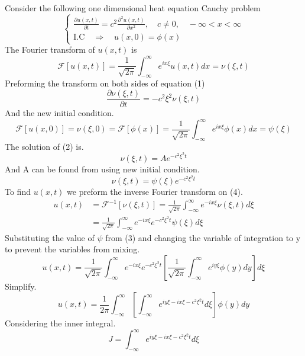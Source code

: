 Consider the following one dimensional heat equation Cauchy problem
\begin{equation}
    \begin{cases}
        \displaystyle \frac{\partial u(x,t)}{\partial t} = c^2\frac{\partial^2 u(x,t)}{\partial x^2}, \quad c \neq 0 , \quad -\infty < x< \infty
        \\
        \text{I.C} \quad \Longrightarrow \quad u(x,0) = \phi(x)
    \end{cases}
\end{equation}
The Fourier transform of $u(x,t)$ is
\[
    \mathscr{F}[u(x,t)] = \frac{1}{\sqrt{2\pi}}\int_{-\infty}^{\infty}e^{ix\xi}u\left(x,t\right)dx= \nu\left(\xi,t\right)    
\]
Preforming the transform on both sides of equation (1)
\begin{equation}
\frac{\partial\nu(\xi,t)}{\partial t} = -c^2 \xi^2 \nu(\xi,t)
\end{equation}
And the new initial condition.
\begin{equation}
\mathscr{F}[u(x,0)] = \nu(\xi,0) =\mathscr{F}[\phi(x)] = \frac{1}{\sqrt{2\pi}}\int_{-\infty}^{\infty}e^{ix\xi}\phi\left(x\right)dx = \psi(\xi)
\end{equation}
The solution of (2) is.
\[
    \nu(\xi,t) = Ae^{-c^2 \xi^2 t}    
\]
And A can be found from using new initial condition. 
\begin{equation}
\nu(\xi,t)= \psi(\xi)e^{-c^2 \xi^2 t}
\end{equation}
To find $u(x,t)$ we preform the inverse Fourier transform on (4).
\begin{align*}
u(x,t) &= \mathscr{F}^{-1}[\nu(\xi,t)] = \frac{1}{\sqrt{2\pi}}\int_{-\infty}^{\infty}e^{-ix\xi}\nu(\xi,t)d\xi
\\
&= \frac{1}{\sqrt{2\pi}}\int_{-\infty}^{\infty}e^{-ix\xi}e^{-c^2 \xi^2 t}\psi(\xi)d\xi
\end{align*}
Substituting the value of $\psi$ from (3) and changing the variable of integration to y to prevent the variables from mixing.
\[
    u(x,t) = \frac{1}{\sqrt{2\pi}}\int_{-\infty}^{\infty}e^{-ix\xi}e^{-c^2 \xi^2 t}\left[\frac{1}{\sqrt{2\pi}}\int_{-\infty}^{\infty}e^{iy\xi}\phi\left(y\right)dy\right]d\xi    
\]
Simplify.
\begin{equation}
u(x,t) = \frac{1}{2\pi}\int_{-\infty}^{\infty}\left[\int_{-\infty}^{\infty}e^{iy\xi -ix\xi - c^2 \xi^2 t} d\xi \right] \phi(y)dy
\end{equation}
Considering the inner integral.
\begin{equation}
J = \int_{-\infty}^{\infty}e^{iy\xi -ix\xi - c^2 \xi^2 t} d\xi
\end{equation}
